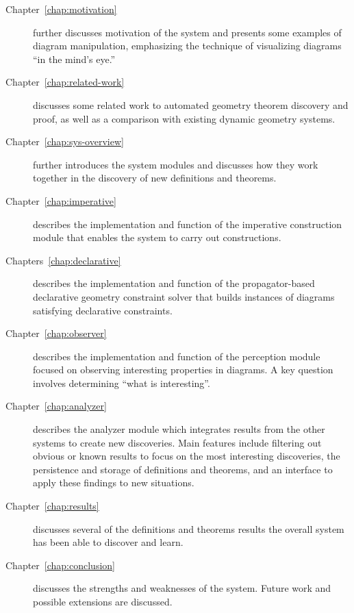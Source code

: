 \begin{description}

\item [Chapter~\ref{chap:motivation}] further discusses motivation of
  the system and presents some examples of diagram manipulation,
  emphasizing the technique of visualizing diagrams ``in the mind's
  eye.''

\item[Chapter~\ref{chap:related-work}] discusses some related work to
  automated geometry theorem discovery and proof, as well as a
  comparison with existing dynamic geometry systems.

\item[Chapter~\ref{chap:sys-overview}] further introduces the system
  modules and discusses how they work together in the discovery of new
  definitions and theorems.

\item[Chapter~\ref{chap:imperative}] describes the implementation and
  function of the imperative construction module that enables the
  system to carry out constructions.

\item[Chapters~\ref{chap:declarative}] describes the implementation
  and function of the propagator-based declarative geometry constraint
  solver that builds instances of diagrams satisfying declarative
  constraints.

\item[Chapter~\ref{chap:observer}] describes the implementation and
  function of the perception module focused on observing interesting
  properties in diagrams. A key question involves determining ``what
  is interesting''.

\item[Chapter~\ref{chap:analyzer}] describes the analyzer module which
  integrates results from the other systems to create new
  discoveries. Main features include filtering out obvious or known
  results to focus on the most interesting discoveries, the
  persistence and storage of definitions and theorems, and an
  interface to apply these findings to new situations.

\item[Chapter~\ref{chap:results}] discusses several of the definitions
  and theorems results the overall system has been able to discover
  and learn.

\item[Chapter~\ref{chap:conclusion}] discusses the strengths and
  weaknesses of the system. Future work and possible extensions are
  discussed.

\end{description}
